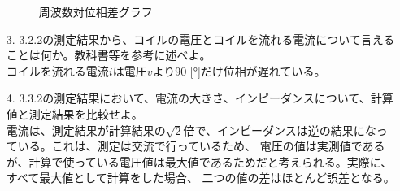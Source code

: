 \documentclass[a4paper]{jarticle}
\begin{document}
\begin{enumerate}
\begin{figure}[h]
\begin{minipage}{0.5\hsize}
\begin{center}
						\end{center}
						\caption{周波数対位相差グラフ}
					\end{minipage}
				\end{figure}
			\item[3.]{3.2.2の測定結果から、コイルの電圧とコイルを流れる電流について言えることは何か。教科書等を参考に述べよ。} \\
				コイルを流れる電流$i$は電圧$v$より90 [°]だけ位相が遅れている。
			\item[4.]{3.3.2の測定結果において、電流の大きさ、インピーダンスについて、計算値と測定結果を比較せよ。} \\
				電流は、測定結果が計算結果の$\sqrt{2}$倍で、インピーダンスは逆の結果になっている。これは、測定は交流で行っているため、
				電圧の値は実測値であるが、計算で使っている電圧値は最大値であるためだと考えられる。実際に、すべて最大値として計算をした場合、
				二つの値の差はほとんど誤差となる。
		\end{enumerate}
\end{document}

